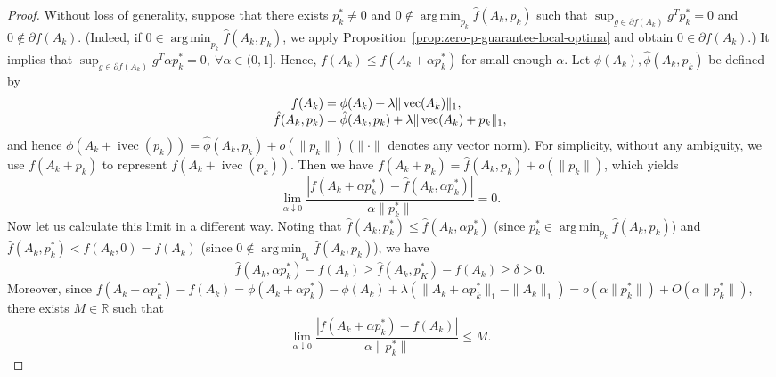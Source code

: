 \documentclass[letterpaper,10pt,journal,final]{IEEEtran}
\theoremstyle{definition}
\theoremstyle{remark}
\newcommand{\kvec}{\operatorname{vec}}
\newcommand{\ikvec}{\operatorname{ivec}}
\begin{document}
\begin{proof}
  Without loss of generality, suppose that there exists $p^*_k \neq 0$ and
  $0 \notin \operatorname{arg\,min}_{p_k} \hat{f}(A_k,p_k)$ such that
  $\sup_{g \in \partial f(A_k)} g^T p^*_k = 0$ and $0 \notin \partial f(A_k)$.
  (Indeed, if $0 \in \operatorname{arg\,min}_{p_k} \hat{f}(A_k,p_k)$, we apply
  Proposition~\ref{prop:zero-p-guarantee-local-optima} and obtain
  $0 \in \partial f(A_k)$.)
  It implies that
  $\sup_{g \in \partial f(A_k)} g^T \alpha p^*_k = 0, \:\forall \alpha \in (0,1]$.
  Hence, $f(A_k) \leq f(A_k+ \alpha p_k^*)$ for small enough $\alpha$.
  Let $\phi(A_k), \hat{\phi}(A_k, p_k)$ be defined by
  \begin{equation*}
    \begin{array}{r@{\;}l}
      f(A_k) &= \phi(A_k) + \lambda \|\kvec(A_k)\|_1, \\
      \hat{f}(A_k,p_k) &= \hat{\phi}(A_k,p_k) + \lambda
  \|\kvec(A_k)+p_k\|_1,
    \end{array}
  \end{equation*}
  and hence $\phi(A_k + \ikvec(p_k)) = \hat{\phi}(A_k, p_k) + o(\|p_k\|)$
  ($\|\cdot\|$ denotes any vector norm).  For simplicity, without any ambiguity,
  we use $f(A_k + p_k)$ to represent $f(A_k + \ikvec(p_k))$.  Then we have
  $f(A_k + p_k) = \hat{f}(A_k,p_k) + o(\|p_k\|)$, which yields
  \begin{equation}
    \label{eq:small-o-limit}
    \lim_{\alpha \downarrow 0} \frac{|f(A_k + \alpha p_k^*) - \hat{f}(A_k, \alpha
      p_k^*)|}{\alpha \|p_k^*\|} = 0.
  \end{equation}
  Now let us calculate this limit in a different way. Noting that $\hat{f}(A_k,
  p_k^*) \leq \hat{f}(A_k, \alpha p_k^*)$ (since $p_k^* \in
  \operatorname{arg\,min}_{p_k} \hat{f}(A_k,p_k)$) and
  $\hat{f}(A_k, p_k^*) < \hat{f}(A_k, 0) = f(A_k)$ (since $0 \notin
  \operatorname{arg\,min}_{p_k} \hat{f}(A_k,p_k)$), we have
  \begin{equation*}
    \hat{f}(A_k, \alpha p_k^*) - f(A_k) \geq \hat{f}(A_k, p_K^*) - f(A_k) \geq \delta > 0.
  \end{equation*}
  Moreover, since $f(A_k + \alpha p_k^*) - f(A_k) = \phi(A_k + \alpha
  p_k^*) - \phi(A_k) + \lambda (\|A_k + \alpha p_k^*\|_1 - \|A_k\|_1) = o(\alpha
  \|p_k^*\|) + O(\alpha \|p_k^*\|)$, there exists $M \in \mathbb{R}$ such that
  \begin{equation*}
    \lim_{\alpha \downarrow 0} \frac{\left|f(A_k + \alpha
        p_k^*) - f(A_k)\right|}{ \alpha \|p_k^*\|} \leq M.
  \end{equation*}

\end{proof}
\end{document}
